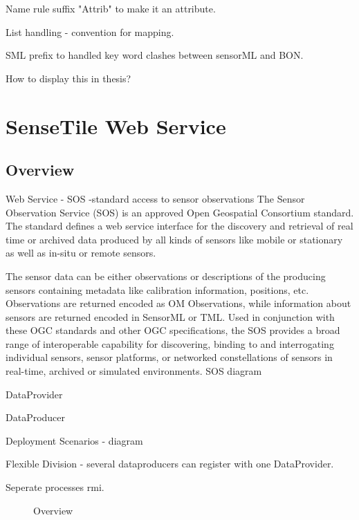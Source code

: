 \documentclass[]{final_report}
\begin{document}
Name rule suffix "Attrib" to make it an attribute.

List handling - convention for mapping.

SML prefix to handled key word clashes between sensorML and BON.

How to display this in thesis?
\section{SenseTile Web Service}
\subsection{Overview}

Web Service - SOS -standard access to sensor observations
The Sensor Observation Service (SOS) is an approved Open Geospatial Consortium standard. The standard defines a web service interface for the discovery and retrieval of real time or archived data produced by all kinds of sensors like mobile or stationary as well as in-situ or remote sensors.

The sensor data can be either observations or descriptions of the producing sensors containing metadata like calibration information, positions, etc. Observations are returned encoded as OM Observations, while information about sensors are returned encoded in SensorML or TML. Used in conjunction with these OGC standards and other OGC specifications, the SOS provides a broad range of interoperable capability for discovering, binding to and interrogating individual sensors, sensor platforms, or networked constellations of sensors in real-time, archived or simulated environments. 
SOS diagram

DataProvider

DataProducer

Deployment Scenarios - diagram

Flexible Division - several dataproducers can register with one DataProvider.

Seperate processes rmi.
 \begin{figure}
\caption{Overview}\label{fig:SystemOverview.png}
\end{figure}
\end{document}

